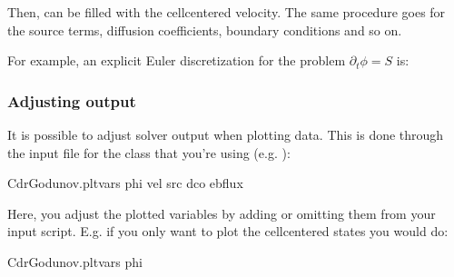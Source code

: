 \documentclass[letterpaper,10pt,english]{sphinxmanual}
\begin{document}
\sphinxAtStartPar
Then,  can be filled with the cell\sphinxhyphen{}centered velocity.
The same procedure goes for the source terms, diffusion coefficients, boundary conditions and so on.

\sphinxAtStartPar
For example, an explicit Euler discretization for the problem \(\partial_t\phi = S\) is:

\begin{sphinxVerbatim}[commandchars=\\\{\},formatcom=\scriptsize]
 

    

   
   

  
\end{sphinxVerbatim}


\subsubsection{Adjusting output}
\label{\detokenize{Solvers/CDR:adjusting-output}}
\sphinxAtStartPar
It is possible to adjust solver output when plotting data.
This is done through the input file for the class that you’re using (e.g. ):

\begin{sphinxVerbatim}[commandchars=\\\{\},formatcom=\scriptsize]
CdrGodunov.plt\PYGZus{}vars  phi vel src dco ebflux  
\end{sphinxVerbatim}

\sphinxAtStartPar
Here, you adjust the plotted variables by adding or omitting them from your input script.
E.g. if you only want to plot the cell\sphinxhyphen{}centered states you would do:

\begin{sphinxVerbatim}[commandchars=\\\{\},formatcom=\scriptsize]
CdrGodunov.plt\PYGZus{}vars  phi  
\end{sphinxVerbatim}
\end{document}

